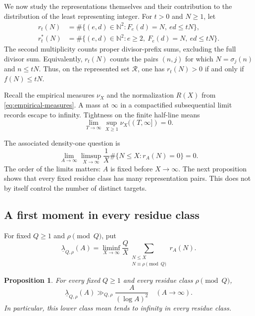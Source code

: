 \documentclass[11pt,letterpaper,reqno]{amsart}
\numberwithin{equation}{section}
\newtheorem{proposition}[theorem]{Proposition}
\theoremstyle{remark}
\newcommand{\N}{\mathbb{N}}
\newcommand{\Rcal}{\mathcal{R}}
\newcommand{\1}{\mathbf 1}
\renewcommand{\leq}{\leqslant}
\renewcommand{\geq}{\geqslant}
\begin{document}
We now study the representations themselves and their contribution to the
distribution of the least representing integer. For $t>0$ and $N\geq1$,
let
\begin{align*}
 r_t(N)&=\#\{(e,d)\in\N^2:F_e(d)=N,\ ed\leq tN\},\\
 r_t^*(N)&=\#\{(e,d)\in\N^2:e\geq2,\ F_e(d)=N,\ ed\leq tN\}.
\end{align*}
The second multiplicity counts proper divisor-prefix sums, excluding the
full divisor sum. Equivalently, $r_t(N)$ counts the pairs $(n,j)$ for
which $N=\sigma_j(n)$ and $n\leq tN$. Thus, on the represented set
$\Rcal$, one has $r_t(N)>0$ if and only if $f(N)\leq tN$.

Recall the empirical measures $\nu_X$ and the normalization $R(X)$ from
\eqref{eq:empirical-measures}. A mass at $\infty$ in a compactified
subsequential limit records escape to infinity. Tightness on the finite
half-line means
\[
 \lim_{T\to\infty}\sup_{X\geq1}\nu_X((T,\infty])=0.
\]

The associated density-one question is
\begingroup
\renewcommand{\theequation}{T}
\begin{equation}\label{eq:T}
 \lim_{A\to\infty}\limsup_{X\to\infty}
 \frac1X\#\{N\leq X:r_A(N)=0\}=0.
\end{equation}
\endgroup
The order of the limits matters: $A$ is fixed before $X\to\infty$.
The next proposition shows that every fixed residue class has many
representation pairs. This does not by itself control the number of
distinct targets.

\subsection{A first moment in every residue class}

For fixed $Q\geq1$ and $\rho\pmod Q$, put
\[
 \underline{\lambda}_{Q,\rho}(A)
 =\liminf_{X\to\infty}\frac QX
 \sum_{\substack{N\leq X\\N\equiv\rho\pmod Q}}r_A(N).
\]

\begin{proposition}
\label{prop:class-first-moment}
For every fixed $Q\geq1$ and every residue class $\rho\pmod Q$,
\[
 \underline{\lambda}_{Q,\rho}(A)
 \gg_{Q,\rho}\frac{A}{(\log A)^2}
 \quad(A\to\infty).
\]
In particular, this lower class mean tends to infinity in every residue
class.
\end{proposition}
\end{document}
